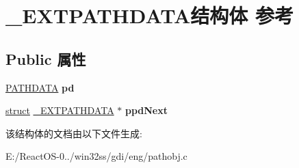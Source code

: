 \hypertarget{struct___e_x_t_p_a_t_h_d_a_t_a}{}\section{\+\_\+\+E\+X\+T\+P\+A\+T\+H\+D\+A\+T\+A结构体 参考}
\label{struct___e_x_t_p_a_t_h_d_a_t_a}
\subsection*{Public 属性}
\begin{DoxyCompactItemize}
\item 
\mbox{\label{struct___e_x_t_p_a_t_h_d_a_t_a_ae1daa2d7cd0c12a4c153d1c5b77a706c}} 
\hyperlink{struct___p_a_t_h_d_a_t_a}{P\+A\+T\+H\+D\+A\+TA} {\bfseries pd}
\item 
\mbox{\label{struct___e_x_t_p_a_t_h_d_a_t_a_ac03e93829e4c6afc1ce86f4903e787f0}} 
\hyperlink{interfacestruct}{struct} \hyperlink{struct___e_x_t_p_a_t_h_d_a_t_a}{\+\_\+\+E\+X\+T\+P\+A\+T\+H\+D\+A\+TA} $\ast$ {\bfseries ppd\+Next}
\end{DoxyCompactItemize}


该结构体的文档由以下文件生成\+:\begin{DoxyCompactItemize}
\item 
E\+:/\+React\+O\+S-\/0../win32ss/gdi/eng/pathobj.\+c\end{DoxyCompactItemize}
